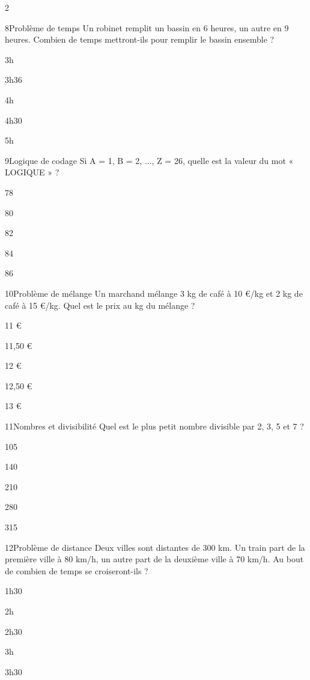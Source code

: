\begin{multicols}{2}
\begin{question}{8}{Problème de temps}
Un robinet remplit un bassin en 6 heures, un autre en 9 heures. Combien de temps mettront-ils pour remplir le bassin ensemble ?
\begin{enumeratebf}
\item 3h
\item 3h36
\item 4h
\item 4h30
\item 5h
\end{enumeratebf}
\end{question}

\begin{question}{9}{Logique de codage}
Si A = 1, B = 2, ..., Z = 26, quelle est la valeur du mot « LOGIQUE » ?
\begin{enumeratebf}
\item 78
\item 80
\item 82
\item 84
\item 86
\end{enumeratebf}
\end{question}
\newcolumn

\begin{question}{10}{Problème de mélange}
Un marchand mélange 3 kg de café à 10 €/kg et 2 kg de café à 15 €/kg. Quel est le prix au kg du mélange ?
\begin{enumeratebf}
\item 11 €
\item 11,50 €
\item 12 €
\item 12,50 €
\item 13 €
\end{enumeratebf}
\end{question}

\begin{question}{11}{Nombres et divisibilité}
Quel est le plus petit nombre divisible par 2, 3, 5 et 7 ?
\begin{enumeratebf}
\item 105
\item 140
\item 210
\item 280
\item 315
\end{enumeratebf}
\end{question}

\begin{question}{12}{Problème de distance}
Deux villes sont distantes de 300 km. Un train part de la première ville à 80 km/h, un autre part de la deuxième ville à 70 km/h. Au bout de combien de temps se croiseront-ils ?
\begin{enumeratebf}
\item 1h30
\item 2h
\item 2h30
\item 3h
\item 3h30
\end{enumeratebf}
\end{question}



\end{multicols}
